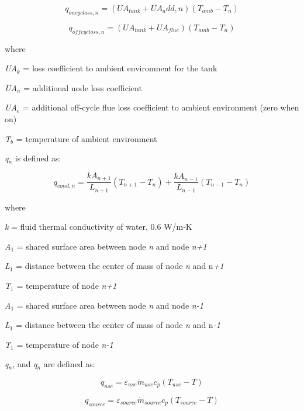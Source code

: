 \begin{equation}
{q_{oncycloss,n}} = ({UA_{tank}} + UA_add,n)({T_{amb}} - {T_n})
\end{equation}

\begin{equation}
{q_{offcycloss,n}} = ({UA_{tank} + UA_{flue}})({T_{amb}} - {T_n})
\end{equation}

where

\emph{UA\(_{k}\)} = loss coefficient to ambient environment for the tank

\emph{UA\(_{n}\)} = additional node loss coefficient

\emph{UA\(_{e}\)} = additional off-cycle flue loss coefficient to ambient environment (zero when on)

\emph{T\(_{b}\)} = temperature of ambient environment

\emph{q\(_{n}\)} is defined as:

\begin{equation}
{q_{cond,n}} = \frac{{k{A_{n + 1}}}}{{{L_{n + 1}}}}({T_{n + 1}} - {T_n}) + \frac{{k{A_{n - 1}}}}{{{L_{n - 1}}}}({T_{n - 1}} - {T_n})
\end{equation}

where

\emph{k} = fluid thermal conductivity of water, 0.6 W/m-K

\emph{A\(_{1}\)} = shared surface area between node \emph{n} and node \emph{n+1}

\emph{L\(_{1}\)} = distance between the center of mass of node \emph{n} and n\emph{+1}

\emph{T\(_{1}\)} = temperature of node \emph{n+1}

\emph{A\(_{1}\)} = shared surface area between node \emph{n} and node \emph{n-1}

\emph{L\(_{1}\)} = distance between the center of mass of node \emph{n} and n\emph{-1}

\emph{T\(_{1}\)} = temperature of node \emph{n-1}

\emph{q\(_{n}\)}, and \emph{q\(_{n}\)} are defined as:

\begin{equation}
{q_{use}} = {\varepsilon_{use}}{\dot m_{use}}{c_p}\left( {{T_{use}} - T} \right)
\end{equation}

\begin{equation}
{q_{source}} = {\varepsilon_{source}}{\dot m_{source}}{c_p}\left( {{T_{source}} - T} \right)
\end{equation}

